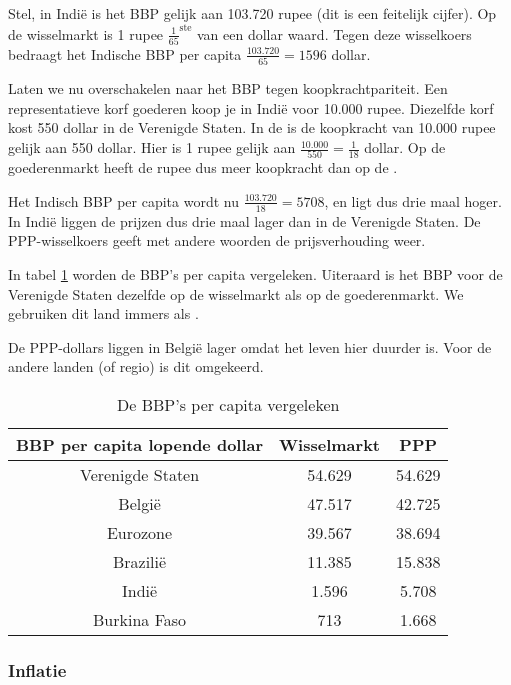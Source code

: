 \par Stel, in Indi\"e is het BBP gelijk aan 103.720 rupee (dit is een feitelijk cijfer). Op de wisselmarkt is 1 rupee $\frac{1}{65}^{\text{ste}}$ van een dollar waard. Tegen deze wisselkoers bedraagt het Indische BBP per capita $\frac{103.720}{65}=1596$ dollar.
\par Laten we nu overschakelen naar het BBP tegen koopkrachtpariteit. Een representatieve korf goederen koop je in Indi\"e voor 10.000 rupee. Diezelfde korf kost 550 dollar in de Verenigde Staten. In de  is de koopkracht van 10.000 rupee gelijk aan 550 dollar. Hier is 1 rupee gelijk aan $\frac{10.000}{550}=\frac{1}{18}$ dollar. Op de goederenmarkt heeft de rupee dus meer koopkracht dan op de .
\par Het Indisch BBP per capita wordt nu $\frac{103.720}{18}=5708$, en ligt dus drie maal hoger. In Indi\"e liggen de prijzen dus drie maal lager dan in de Verenigde Staten. De PPP-wisselkoers geeft met andere woorden de prijsverhouding weer.\\

\par In tabel \ref{tab:h5bbpcap} worden de BBP's per capita vergeleken. Uiteraard is het BBP voor de Verenigde Staten dezelfde op de wisselmarkt als op de goederenmarkt. We gebruiken dit land immers als .
\par De PPP-dollars liggen in Belgi\"e lager omdat het leven hier duurder is. Voor de andere landen (of regio) is dit omgekeerd.

\begin{table}[H]
\centering
\begin{tabular}{ccc}
BBP per capita lopende dollar & Wisselmarkt & PPP \\ \hline
Verenigde Staten & 54.629 & 54.629 \\
Belgi\"e & 47.517 & 42.725 \\
Eurozone & 39.567 & 38.694 \\
Brazili\"e & 11.385 & 15.838 \\
Indi\"e & 1.596 & 5.708 \\
Burkina Faso & 713 & 1.668
\end{tabular}
\caption{De BBP's per capita vergeleken}
\label{tab:h5bbpcap}
\end{table}

\subsubsection{Inflatie}

